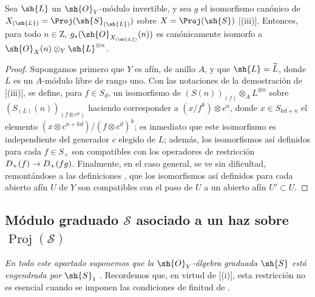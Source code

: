 \documentclass[oneside,10pt]{amsart}
\makeatletter
\newcommand{\ega@arrow}[2]{\mathchoice{#1}{#2}{#2}{#2}}
\renewcommand{\to}{\ega@arrow{\longrightarrow}{\rightarrow}}
\let\EGAOriginalLabel\label
\renewcommand{\label}[1]{\phantomsection\EGAOriginalLabel{#1}}
\makeatother
\begin{document}
\begin{proposition}[3.2.10]
\label{II.3.2.10}
Sea $\sh{L}$ un $\sh{O}_Y$-módulo invertible, y sea $g$ el isomorfismo canónico de $X_{(\sh{L})}=\Proj(\sh{S}_{(\sh{L})})$ sobre $X=\Proj(\sh{S})$ [(iii)].
Entonces, para todo $n\in\mathrm{Z}$, $g_*(\sh{O}_{X_{(\sh{L})}}(n))$ es canónicamente isomorfo a $\sh{O}_X(n)\otimes_Y\sh{L}^{\otimes n}$.
\end{proposition}

\begin{proof}
Supongamos primero que $Y$ es afín, de anillo $A$, y que $\sh{L}=\widetilde{L}$, donde $L$ es un $A$-módulo libre de rango uno.
Con las notaciones de la demostración de [(iii)], se define, para $f\in S_d$, un isomorfismo de $(S(n))_{(f)}\otimes_A L^{\otimes n}$ sobre $(S_{(L)}(n))_{(f\otimes c^d)}$ haciendo corresponder a $(x/f^k)\otimes c^n$, donde $x\in S_{kd+n}$ el elemento $(x\otimes c^{n+kd})/(f\otimes c^d)^k$; es inmediato que este isomorfismo es independiente del generador $c$ elegido de $L$; además, los isomorfismos así definidos para cada $f\in S_+$ son compatibles con los operadores de restricción $D_+(f)\to D_+(fg)$.
Finalmente, en el caso general, se ve sin dificultad, remontándose a las definiciones , que los isomorfismos así definidos para cada abierto afín $U$ de $Y$ son compatibles con el paso de $U$ a un abierto afín $U'\subset U$.
\end{proof}

\subsection{Módulo graduado $\mathcal{S}$ asociado a un haz sobre $\operatorname{Proj}(\mathcal{S})$}
\label{subsection:II.3.3}

\emph{En todo este apartado suponemos que la $\sh{O}_Y$-álgebra graduada $\sh{S}$ está engendrada por $\sh{S}_1$} .
Recordemos que, en virtud de [(i)], esta restricción no es esencial cuando se imponen las condiciones de finitud de .
\end{document}
